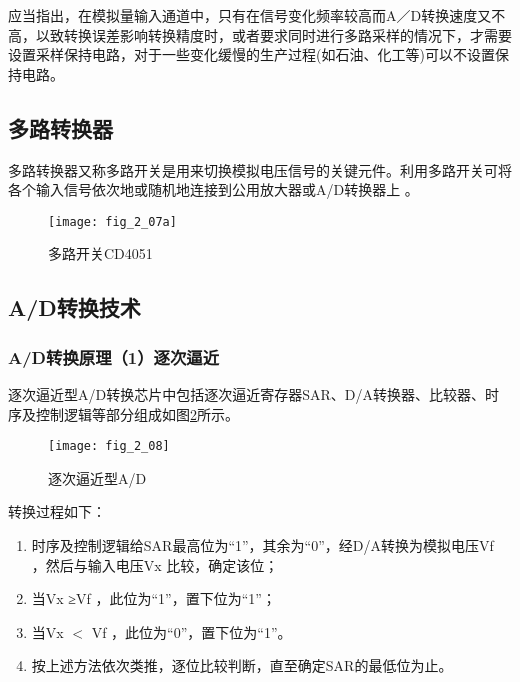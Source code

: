 应当指出，在模拟量输入通道中，只有在信号变化频率较高而A／D转换速度又不高，以致转换误差影响转换精度时，或者要求同时进行多路采样的情况下，才需要设置采样保持电路，对于一些变化缓慢的生产过程(如石油、化工等)可以不设置保持电路。



\subsection{多路转换器}

多路转换器又称多路开关是用来切换模拟电压信号的关键元件。利用多路开关可将各个输入信号依次地或随机地连接到公用放大器或A/D转换器上 。


\begin{figure}[h]
  \centering
  \texttt{[image: fig\_2\_07a]}\\
  \caption{多路开关CD4051}\label{fig_2_07a}
\end{figure}


\subsection{A/D转换技术}


\subsubsection{A/D转换原理（1）逐次逼近}

逐次逼近型A/D转换芯片中包括逐次逼近寄存器SAR、D/A转换器、比较器、时序及控制逻辑等部分组成如图\ref{fig_2_08}所示。


\begin{figure}[h]
  \centering
  \texttt{[image: fig\_2\_08]}\\
  \caption{逐次逼近型A/D}\label{fig_2_08}
\end{figure}

转换过程如下：

\begin{enumerate}
  \item 时序及控制逻辑给SAR最高位为“1”，其余为“0”，经D/A转换为模拟电压Vf ，然后与输入电压Vx 比较，确定该位；
  \item 当Vx ≥Vf ，此位为“1”，置下位为“1”；
  \item 当Vx $<$ Vf ，此位为“0”，置下位为“1”。
  \item 按上述方法依次类推，逐位比较判断，直至确定SAR的最低位为止。
\end{enumerate}




